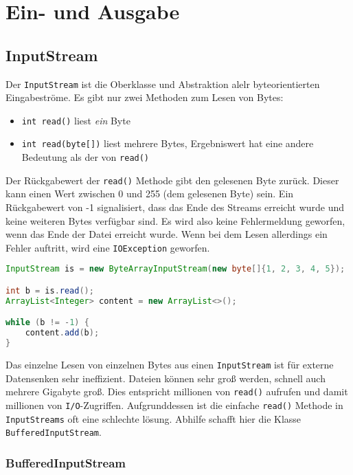 \chapter{Ein- und Ausgabe}

\section{InputStream}
\label{inputstream}

Der \lstinline{InputStream} ist die Oberklasse und Abstraktion alelr
byteorientierten Eingabeströme. Es gibt nur zwei Methoden zum Lesen von Bytes:
\begin{itemize}
    \item \lstinline{int read()} liest \textit{ein} Byte
    \item \lstinline{int read(byte[])} liest mehrere Bytes, Ergebniswert hat eine andere
          Bedeutung als der von \lstinline{read()}
\end{itemize}

Der Rückgabewert der \lstinline{read()} Methode gibt den gelesenen Byte zurück.
Dieser kann einen Wert zwischen 0 und 255 (dem gelesenen Byte) sein. Ein
Rückgabewert von -1 signalisiert, dass das Ende des Streams erreicht wurde und
keine weiteren Bytes verfügbar sind. Es wird also keine Fehlermeldung geworfen,
wenn das Ende der Datei erreicht wurde. Wenn bei dem Lesen allerdings ein
Fehler auftritt, wird eine \lstinline{IOException} geworfen.

\begin{lstlisting}[language=Java, caption={Beispiel für InputStream}]
InputStream is = new ByteArrayInputStream(new byte[]{1, 2, 3, 4, 5});

int b = is.read();
ArrayList<Integer> content = new ArrayList<>();

while (b != -1) {
    content.add(b);
}
\end{lstlisting}

Das einzelne Lesen von einzelnen Bytes aus einen \lstinline{InputStream} ist für externe Datensenken sehr
ineffizient. Dateien können sehr groß werden, schnell auch mehrere Gigabyte
groß. Dies entspricht millionen von \lstinline{read()} aufrufen und damit
millionen von \texttt{I/O}-Zugriffen. Aufgrunddessen ist die einfache
\lstinline{read()} Methode in \lstinline{InputStreams} oft eine schlechte
lösung. Abhilfe schafft hier die Klasse \lstinline{BufferedInputStream}.

\subsection{BufferedInputStream}

